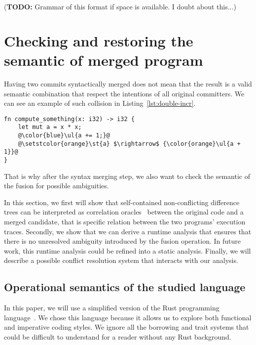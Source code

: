 \documentclass[a4paper,11pt]{article}
\newcommand\todo[1]{{\color{teal}(\textbf{TODO:} #1)}}
\begin{document}
\todo{Grammar of this format if space is available. I doubt about this...}

\section{Checking and restoring the semantic of merged program}
\label{sec:semantic-merge}

Having two commits syntactically merged does not mean that the result
is a valid semantic combination that respect the intentions of all
original committers. We can see an example of such collision in Listing~\ref{lst:double-incr}.

\begin{lstlisting}[label=lst:double-incr, caption={Double fix of the same function by different commits. The syntactic fusion does not create a conflict but semantically we will most probably create a bug here.}]
fn compute_something(x: i32) -> i32 {
    let mut a = x * x;
    @\color{blue}\ul{a += 1;}@
    @\setstcolor{orange}\st{a} $\rightarrow$ {\color{orange}\ul{a + 1}}@
}
\end{lstlisting}

That is why after the syntax merging step, we also want to check the
semantic of the fusion for possible ambiguities.

In this section, we first will show that self-contained
non-conflicting difference trees can be interpreted as correlation
oracles~\cite{girka2017verifiable} between the original code and a merged candidate,
that is specific relation between the two programs' execution
traces. Secondly, we show that we can derive a runtime analysis that
ensures that there is no unresolved ambiguity introduced by the fusion
operation. In future work, this runtime analysis could be refined into
a static analysis. Finally, we will describe a possible conflict resolution system that interacts with our analysis.

\subsection{Operational semantics of the studied language}

In this paper, we will use a simplified version of the Rust
programming language~\cite{rust-lang}. We chose this language because it
allows us to explore both functional and imperative coding styles.  We ignore all the borrowing and trait systems that could be difficult to understand for a reader without any Rust background.
\end{document}
